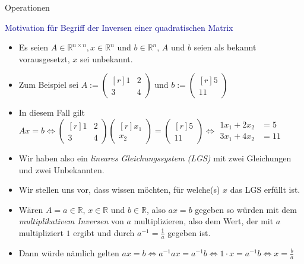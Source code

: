 \documentclass[
  8pt,
  ignorenonframetext,
]{beamer}
\providecommand{\tightlist}{%
  \setlength{\itemsep}{0pt}\setlength{\parskip}{0pt}}
\begin{document}
\begin{frame}{Operationen}
\protect\hypertarget{operationen-21}{}
\small

\textcolor{darkblue}{Motivation für Begriff der Inversen einer quadratischen Matrix}
 \footnotesize

\begin{itemize}
\tightlist
\item
  Es seien \(A\in \mathbb{R}^{n \times n}, x \in \mathbb{R}^n\) und
  \(b \in \mathbb{R}^n\), \(A\) und \(b\) seien als bekannt
  vorausgesetzt, \(x\) sei unbekannt.
\item
  Zum Beispiel sei
  \(A := \begin{pmatrix*}[r] 1 & 2 \\ 3 & 4 \end{pmatrix*}\) und
  \(b := \begin{pmatrix*}[r] 5 \\ 11 \end{pmatrix*}\)
\item
  In diesem Fall gilt
  \(Ax = b \Leftrightarrow \begin{pmatrix*}[r] 1 & 2 \\ 3 & 4 \end{pmatrix*} \begin{pmatrix*}[r] x_1 \\ x_2 \end{pmatrix*} = \begin{pmatrix*}[r] 5 \\ 11 \end{pmatrix*} \Leftrightarrow \begin{matrix} 1x_1 + 2x_2 & = 5 \\ 3x_1 + 4x_2 & = 11 \end{matrix}\)
\item
  Wir haben also ein \emph{lineares Gleichungssystem (LGS)} mit zwei
  Gleichungen und zwei Unbekannten.
\item
  Wir stellen uns vor, dass wissen möchten, für welche(s) \(x\) das LGS
  erfüllt ist.
\item
  Wären \(A = a \in \mathbb{R}\), \(x \in \mathbb{R}\) und
  \(b \in \mathbb{R}\), also \(ax = b\) gegeben so würden mit dem
  \emph{multiplikativem Inversen} von \(a\) multiplizieren, also dem
  Wert, der mit \(a\) multipliziert \(1\) ergibt und durch
  \(a^{-1} = \frac{1}{a}\) gegeben ist.
\item
  Dann würde nämlich gelten
  \(ax = b \Leftrightarrow a^{-1}ax = a^{-1}b \Leftrightarrow 1 \cdot x = a^{-1}b \Leftrightarrow x = \frac{b}{a}\)

\end{itemize}
\end{frame}
\end{document}

